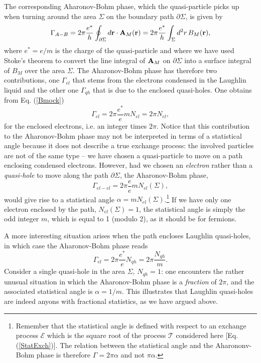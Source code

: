 \documentclass[10pt]{book}
\newcommand{\br}{{\bf r}}
\newcommand{\bA}{{\bf A}}
\newcommand{\Tmath}{\mathcal{T}}
\newcommand{\Emath}{\mathcal{E}}
\newcommand{\beq}{\begin{equation}}
\newcommand{\eeq}{\end{equation}}
\begin{document}
The corresponding Aharonov-Bohm phase, which the quasi-particle picks up when turning around the area $\Sigma$ on 
the boundary path $\partial\Sigma$, is given by
$$\Gamma_{A-B}=2\pi\frac{e^*}{h}\oint_{\partial\Sigma} d\br\cdot\bA_M(\br)
 = 2\pi\frac{e^*}{h}\int_{\Sigma} d^2r\, B_M(\br),$$
where $e^*=e/m$ is the charge of the quasi-particle and where we have used Stoke's theorem to convert the line integral
of $\bA_M$ on $\partial \Sigma$ into a surface integral of $B_M$ over the area $\Sigma$. The Aharonov-Bohm phase has therefore
two contributions, one $\Gamma_{el}$
that stems from the electrons condensed in the Laughlin liquid and the other one $\Gamma_{qh}$ that is due to the 
enclosed quasi-holes.
One obtains from Eq. (\ref{Bmock})
\beq\label{ABel}
\Gamma_{el}=2\pi\frac{e^*}{e} m N_{el}=2\pi N_{el},
\eeq
for the enclosed electrons, i.e. an integer times $2\pi$. Notice that this contribution to the Aharonov-Bohm phase may not
be interpreted in terms of a statistical angle because it
does not describe a true exchange process: the involved particles are not 
of the same type -- we have chosen a quasi-particle to move on a path enclosing condensed electrons. 
However, had we chosen an {\sl electron} rather than a {\sl quasi-hole} to move along the path $\partial \Sigma$,
the Aharonov-Bohm phase,
$$\Gamma_{el-el}=2\pi\frac{e}{e} mN_{el}(\Sigma),
$$
would give rise to a statistical angle $\alpha = mN_{el}(\Sigma)$.\footnote{Remember that the statistical angle 
is defined with respect to an exchange process $\Emath$ which
is the square root of the process $\Tmath$ considered here [Eq. (\ref{StatExch})]. 
The relation between the statistical angle and the Aharononv-Bohm
phase is therefore $\Gamma=2\pi \alpha$ and not $\pi\alpha$.} 
If we have only one electron enclosed by the path, $N_{el}(\Sigma)=1$, the statistical angle is simply the odd
integer $m$, which is equal to 1 (modulo 2), as it should be for fermions.


A more interesting situation arises when the path encloses Laughlin quasi-holes, in which case the Aharonov-Bohm phase reads
\beq\label{ABqh}
\Gamma_{el}=2\pi\frac{e^*}{e}  N_{qh}=2\pi \frac{N_{qh}}{m}.
\eeq
Consider a single quasi-hole in the area $\Sigma$, $N_{qh}=1$: one encounters the rather unusual situation in which the Aharonov-Bohm
phase is a {\sl fraction} of $2\pi$, and the associated statistical angle is $\alpha=1/m$. This illustrates that
Laughlin quasi-holes are indeed anyons with fractional statistics, as we have argued above.
\end{document}
